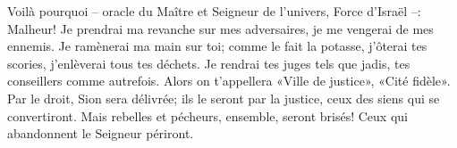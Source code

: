 Voilà pourquoi – oracle du Maître et Seigneur de l’univers, Force d’Israël –:
	Malheur!
	Je prendrai ma revanche sur mes adversaires, je me vengerai de mes ennemis.
Je ramènerai ma main sur toi;
	comme le fait la potasse, j’ôterai tes scories,
	j’enlèverai tous tes déchets.
Je rendrai tes juges tels que jadis, tes conseillers comme autrefois.
	Alors on t’appellera «Ville de justice», «Cité fidèle».
Par le droit, Sion sera délivrée;
	ils le seront par la justice, ceux des siens qui se convertiront.
Mais rebelles et pécheurs, ensemble, seront brisés!
	Ceux qui abandonnent le Seigneur périront.
